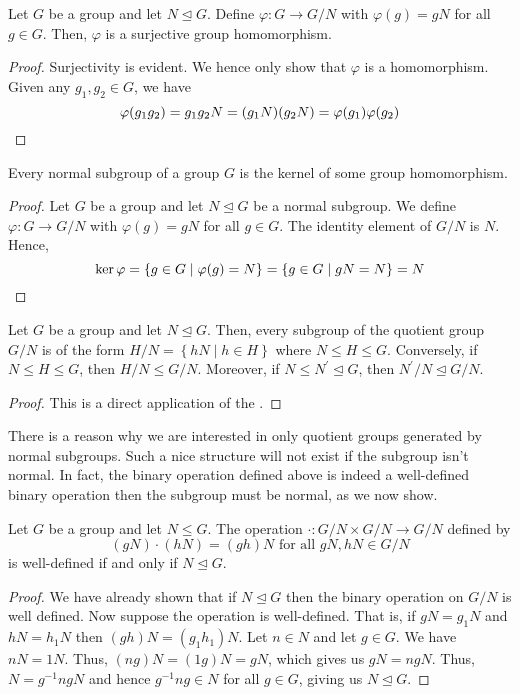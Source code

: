\begin{prop} \label{prop:quotient-surjective-homo}
    Let $G$ be a group and let $N \trianglelefteq G$. Define $\varphi \colon G \to G/N$ with $\varphi(g) = gN$ for all $g \in G$. Then, $\varphi$ is a surjective group homomorphism.
\end{prop}
\begin{proof}
    Surjectivity is evident. We hence only show that $\varphi$ is a homomorphism. Given any $g_1,g_2 \in G$, we have
    \[
        \varphi(g_1g_2) = g_1g_2N = (g_1N)(g_2N) = \varphi(g_1)\varphi(g_2) \qedhere
    \]
\end{proof}
\begin{prop} \label{prop:normal-subgroup-is-kernel}
    Every normal subgroup of a group $G$ is the kernel of some group homomorphism.
\end{prop}
\begin{proof}
    Let $G$ be a group and let $N \trianglelefteq G$ be a normal subgroup. We define $\varphi \colon G \to G/N$ with $\varphi(g) = gN$ for all $g \in G$. The identity element of $G/N$ is $N$. Hence,
    \[
        \ker\varphi = \left\{ g \in G \mid \varphi(g) = N \right\} = \left\{ g \in G \mid gN = N \right\} = N \qedhere 
    \]
\end{proof}
\begin{prop} \label{prop:subgroup-of-quotient-is-left-coset}
    Let $G$ be a group and let $N \trianglelefteq G$. Then, every subgroup of the quotient group $G/N$ is of the form $H/N = \left\{ hN \mid h \in H \right\}$ where $N \leq H \leq G$. Conversely, if $N \leq H \leq G$, then $H/N \leq G/N$. Moreover, if $N \leq N^{\prime} \trianglelefteq G$, then $N^{\prime}/N \trianglelefteq G/N$.
\end{prop}
\begin{proof}
    This is a direct application of the .
\end{proof}

There is a reason why we are interested in only quotient groups generated by normal subgroups. Such a nice structure will not exist if the subgroup isn't normal. In fact, the binary operation defined above is indeed a well-defined binary operation then the subgroup must be normal, as we now show.

\begin{prop} \label{prop:binary-well-defined-normal-quotient}
    Let $G$ be a group and let $N \leq G$. The operation $\cdot \colon G/N \times G/N \to G/N$ defined by
    \[
        (gN) \cdot (hN) = (gh)N \text{ for all } gN,hN \in G/N
    \]
    is well-defined if and only if $N \trianglelefteq G$.
\end{prop}
\begin{proof}
    We have already shown that if $N \trianglelefteq G$ then the binary  operation on $G/N$ is well defined. Now suppose the operation is well-defined. That is, if $gN = g_1N$ and $hN = h_1N$ then $(gh)N = (g_1h_1)N$. Let $n \in N$ and let $g \in G$. We have $nN = 1N$. Thus, $(ng)N = (1g)N = gN$, which gives us $gN = ngN$. Thus, $N = g^{-1}ngN$ and hence $g^{-1}ng \in N$ for all $g \in G$, giving us $N \trianglelefteq G$. 
\end{proof}